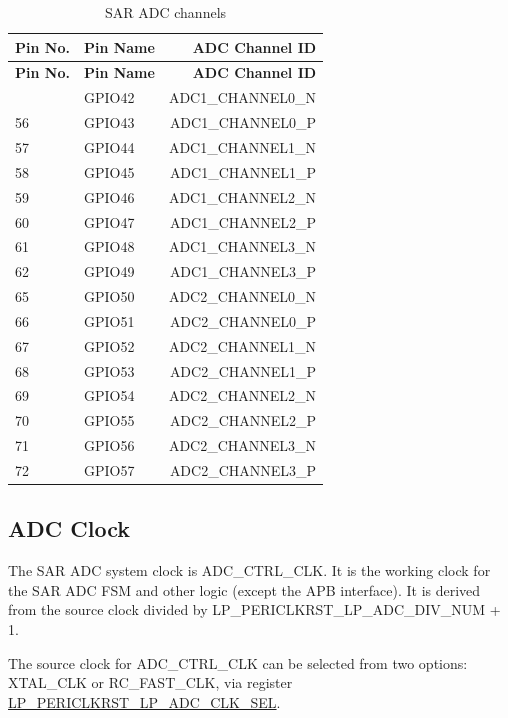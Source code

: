\documentclass[main\_\_EN.tex]{subfiles}
\begin{document}
\begin{longtable}{ |l|l|r|}
    \caption{SAR ADC channels}
    \label{tab:adc-sar-adc-input-signals}
    \\\hline
    \rowcolor{lightgray}
    \textbf{Pin No.} & \textbf{Pin Name} & \textbf{ADC Channel ID}  \\\hline
    \endfirsthead
    \hline
    \rowcolor{lightgray}
    \textbf{Pin No.} & \textbf{Pin Name} & \textbf{ADC Channel ID}  \\\hline
    \endhead
    \hline
    \endfoot
55 & GPIO42 & ADC1\_CHANNEL0\_N   \\ \hline
56 & GPIO43 & ADC1\_CHANNEL0\_P   \\ \hline
57 & GPIO44 & ADC1\_CHANNEL1\_N   \\ \hline
58 & GPIO45 & ADC1\_CHANNEL1\_P   \\ \hline
59 & GPIO46 & ADC1\_CHANNEL2\_N   \\ \hline
60 & GPIO47 & ADC1\_CHANNEL2\_P   \\ \hline
61 & GPIO48 & ADC1\_CHANNEL3\_N  \\ \hline
62 & GPIO49 & ADC1\_CHANNEL3\_P   \\ \hline
65 & GPIO50 & ADC2\_CHANNEL0\_N   \\ \hline
66 & GPIO51 & ADC2\_CHANNEL0\_P \\ \hline
67 & GPIO52 & ADC2\_CHANNEL1\_N   \\ \hline
68 & GPIO53 & ADC2\_CHANNEL1\_P  \\ \hline
69 & GPIO54 & ADC2\_CHANNEL2\_N  \\ \hline
70 & GPIO55 & ADC2\_CHANNEL2\_P  \\ \hline
71 & GPIO56 & ADC2\_CHANNEL3\_N  \\ \hline
72 & GPIO57 & ADC2\_CHANNEL3\_P   \\ \hline

\end{longtable}

\subsection{ADC Clock}
\label{sec:sar-adc-clock}

The SAR ADC system clock is ADC\_CTRL\_CLK. It is the working clock for the SAR ADC FSM and other logic (except the APB interface). It is derived from the source clock divided by LP\_PERICLKRST\_LP\_ADC\_DIV\_NUM + 1.

The source clock for ADC\_CTRL\_CLK can be selected from two options: XTAL\_CLK or RC\_FAST\_CLK, via register \hyperref[fielddesc:LPPERICLKRSTLPADCCLKSEL]{LP\_PERICLKRST\_LP\_ADC\_CLK\_SEL}.
\end{document}
